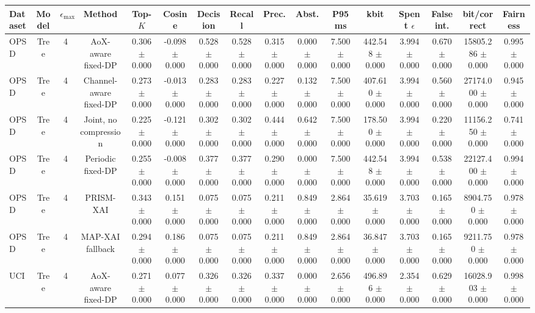 \begin{tabular}{lccccccccccccccc}
\toprule
Dataset & Model & $\epsilon_{\max}$ & Method & Top-$K$ & Cosine & Decision & Recall & Prec. & Abst. & P95 ms & kbit & Spent $\epsilon$ & False int. & bit/correct & Fairness \\
\midrule
OPSD & Tree & 4 & AoX-aware fixed-DP & 0.306 $\pm$ 0.000 & -0.098 $\pm$ 0.000 & 0.528 $\pm$ 0.000 & 0.528 $\pm$ 0.000 & 0.315 $\pm$ 0.000 & 0.000 $\pm$ 0.000 & 7.500 $\pm$ 0.000 & 442.548 $\pm$ 0.000 & 3.994 $\pm$ 0.000 & 0.670 $\pm$ 0.000 & 15805.286 $\pm$ 0.000 & 0.995 $\pm$ 0.000 \\
OPSD & Tree & 4 & Channel-aware fixed-DP & 0.273 $\pm$ 0.000 & -0.013 $\pm$ 0.000 & 0.283 $\pm$ 0.000 & 0.283 $\pm$ 0.000 & 0.227 $\pm$ 0.000 & 0.132 $\pm$ 0.000 & 7.500 $\pm$ 0.000 & 407.610 $\pm$ 0.000 & 3.994 $\pm$ 0.000 & 0.560 $\pm$ 0.000 & 27174.000 $\pm$ 0.000 & 0.945 $\pm$ 0.000 \\
OPSD & Tree & 4 & Joint, no compression & 0.225 $\pm$ 0.000 & -0.121 $\pm$ 0.000 & 0.302 $\pm$ 0.000 & 0.302 $\pm$ 0.000 & 0.444 $\pm$ 0.000 & 0.642 $\pm$ 0.000 & 7.500 $\pm$ 0.000 & 178.500 $\pm$ 0.000 & 3.994 $\pm$ 0.000 & 0.220 $\pm$ 0.000 & 11156.250 $\pm$ 0.000 & 0.741 $\pm$ 0.000 \\
OPSD & Tree & 4 & Periodic fixed-DP & 0.255 $\pm$ 0.000 & -0.008 $\pm$ 0.000 & 0.377 $\pm$ 0.000 & 0.377 $\pm$ 0.000 & 0.290 $\pm$ 0.000 & 0.000 $\pm$ 0.000 & 7.500 $\pm$ 0.000 & 442.548 $\pm$ 0.000 & 3.994 $\pm$ 0.000 & 0.538 $\pm$ 0.000 & 22127.400 $\pm$ 0.000 & 0.994 $\pm$ 0.000 \\
OPSD & Tree & 4 & PRISM-XAI & 0.343 $\pm$ 0.000 & 0.151 $\pm$ 0.000 & 0.075 $\pm$ 0.000 & 0.075 $\pm$ 0.000 & 0.211 $\pm$ 0.000 & 0.849 $\pm$ 0.000 & 2.864 $\pm$ 0.000 & 35.619 $\pm$ 0.000 & 3.703 $\pm$ 0.000 & 0.165 $\pm$ 0.000 & 8904.750 $\pm$ 0.000 & 0.978 $\pm$ 0.000 \\
OPSD & Tree & 4 & MAP-XAI fallback & 0.294 $\pm$ 0.000 & 0.186 $\pm$ 0.000 & 0.075 $\pm$ 0.000 & 0.075 $\pm$ 0.000 & 0.211 $\pm$ 0.000 & 0.849 $\pm$ 0.000 & 2.864 $\pm$ 0.000 & 36.847 $\pm$ 0.000 & 3.703 $\pm$ 0.000 & 0.165 $\pm$ 0.000 & 9211.750 $\pm$ 0.000 & 0.978 $\pm$ 0.000 \\
UCI & Tree & 4 & AoX-aware fixed-DP & 0.271 $\pm$ 0.000 & 0.077 $\pm$ 0.000 & 0.326 $\pm$ 0.000 & 0.326 $\pm$ 0.000 & 0.337 $\pm$ 0.000 & 0.000 $\pm$ 0.000 & 2.656 $\pm$ 0.000 & 496.896 $\pm$ 0.000 & 2.354 $\pm$ 0.000 & 0.629 $\pm$ 0.000 & 16028.903 $\pm$ 0.000 & 0.998 $\pm$ 0.000 \\

\end{tabular}

